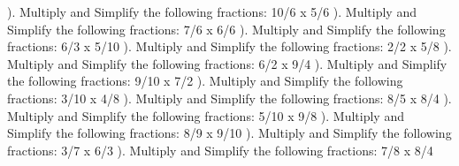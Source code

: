 \documentclass{article}%
\begin{document}
). Multiply and Simplify the following fractions: 10/6 x 5/6%
\newline%
\newline%
). Multiply and Simplify the following fractions: 7/6 x 6/6%
\newline%
\newline%
). Multiply and Simplify the following fractions: 6/3 x 5/10%
\newline%
\newline%
). Multiply and Simplify the following fractions: 2/2 x 5/8%
\newline%
\newline%
). Multiply and Simplify the following fractions: 6/2 x 9/4%
\newline%
\newline%
). Multiply and Simplify the following fractions: 9/10 x 7/2%
\newline%
\newline%
). Multiply and Simplify the following fractions: 3/10 x 4/8%
\newline%
\newline%
). Multiply and Simplify the following fractions: 8/5 x 8/4%
\newline%
\newline%
). Multiply and Simplify the following fractions: 5/10 x 9/8%
\newline%
\newline%
). Multiply and Simplify the following fractions: 8/9 x 9/10%
\newline%
\newline%
). Multiply and Simplify the following fractions: 3/7 x 6/3%
\newline%
\newline%
). Multiply and Simplify the following fractions: 7/8 x 8/4%
\newline%
\newline%
\newline%
\end{document}
